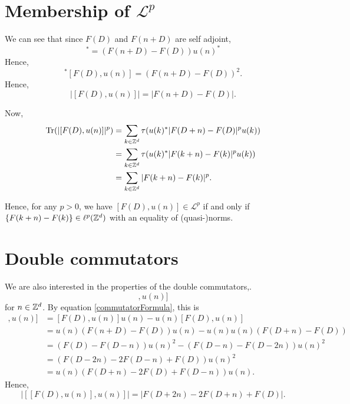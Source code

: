 \section{Membership of $\mathcal{L}^p$}
We can see that since $F(D)$ and $F(n+D)$ are self adjoint, 
\begin{equation}
    [F(D),u(n)]^* = (F(n+D)-F(D))u(n)^*
\end{equation}
Hence,
\begin{equation}
    [F(D),u(n)]^*[F(D),u(n)] = (F(n+D)-F(D))^2.
\end{equation}
Hence,
\begin{equation}
    |[F(D),u(n)]| = |F(n+D)-F(D)|.
\end{equation}

Now,
\begin{align}
    \operatorname{Tr}(|[F(D),u(n)]|^p) &= \sum_{k \in \mathbb{Z}^d} \tau(u(k)^*|F(D+n)-F(D)|^pu(k))\\
    &= \sum_{k \in \mathbb{Z}^d} \tau(u(k)^*|F(k+n)-F(k)|^pu(k))\\
    &= \sum_{k \in \mathbb{Z}^d} |F(k+n)-F(k)|^p.
\end{align}

Hence, for any $p > 0$, we have $[F(D),u(n)] \in \mathcal{L}^p$ if and only if
$\{F(k+n)-F(k)\} \in \ell^p(\mathbb{Z}^d)$ with an equality of (quasi-)norms.


\section{Double commutators}

We are also interested in the properties of the double commutators,.
\begin{equation*}
    [[F(D),u(n)],u(n)]
\end{equation*}
for $n \in \mathbb{Z}^d$. By equation \ref{commutatorFormula}, this is
\begin{align}
    [[F(D),u(n)],u(n)] &= [F(D),u(n)]u(n) - u(n)[F(D),u(n)] \\
                       &= u(n)(F(n+D)-F(D))u(n)-u(n)u(n)(F(D+n)-F(D))\\
                       &= (F(D)-F(D-n))u(n)^2-(F(D-n)-F(D-2n))u(n)^2\\
                       &= (F(D-2n)-2F(D-n)+F(D))u(n)^2\\
                       &= u(n)(F(D+n)-2F(D)+F(D-n))u(n).
\end{align}
Hence,
\begin{equation*}
    |[[F(D),u(n)],u(n)]| = |F(D+2n)-2F(D+n)+F(D)|.
\end{equation*}

